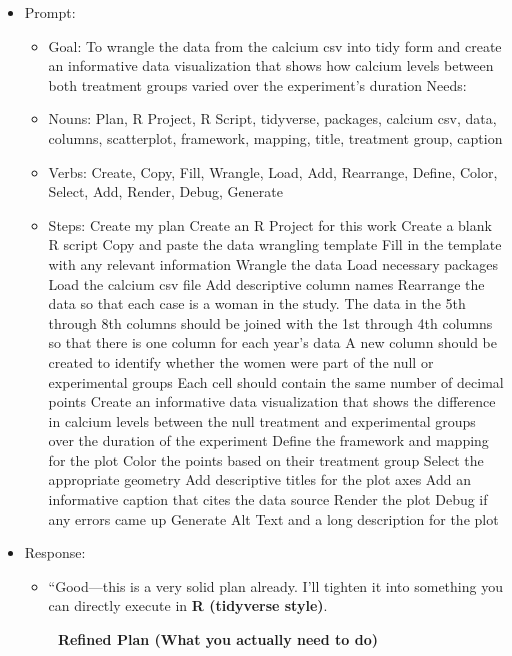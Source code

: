 \documentclass[
  letterpaper,
  DIV=11,
  numbers=noendperiod]{scrartcl}
\begin{document}
\begin{itemize}
\item
  Prompt:

  \begin{itemize}
  \item
    Goal: To wrangle the data from the calcium csv into tidy form and
    create an informative data visualization that shows how calcium
    levels between both treatment groups varied over the experiment's
    duration Needs:
  \item
    Nouns: Plan, R Project, R Script, tidyverse, packages, calcium csv,
    data, columns, scatterplot, framework, mapping, title, treatment
    group, caption
  \item
    Verbs: Create, Copy, Fill, Wrangle, Load, Add, Rearrange, Define,
    Color, Select, Add, Render, Debug, Generate
  \item
    Steps: Create my plan Create an R Project for this work Create a
    blank R script Copy and paste the data wrangling template Fill in
    the template with any relevant information Wrangle the data Load
    necessary packages Load the calcium csv file Add descriptive column
    names Rearrange the data so that each case is a woman in the study.
    The data in the 5th through 8th columns should be joined with the
    1st through 4th columns so that there is one column for each year's
    data A new column should be created to identify whether the women
    were part of the null or experimental groups Each cell should
    contain the same number of decimal points Create an informative data
    visualization that shows the difference in calcium levels between
    the null treatment and experimental groups over the duration of the
    experiment Define the framework and mapping for the plot Color the
    points based on their treatment group Select the appropriate
    geometry Add descriptive titles for the plot axes Add an informative
    caption that cites the data source Render the plot Debug if any
    errors came up Generate Alt Text and a long description for the plot
  \end{itemize}
\item
  Response:

  \begin{itemize}
  \item
    ``Good---this is a very solid plan already. I'll tighten it into
    something you can directly execute in \textbf{R (tidyverse style)}.

    \textbf{🔧 Refined Plan (What you actually need to do)}


\end{itemize}
\end{itemize}
\end{document}

